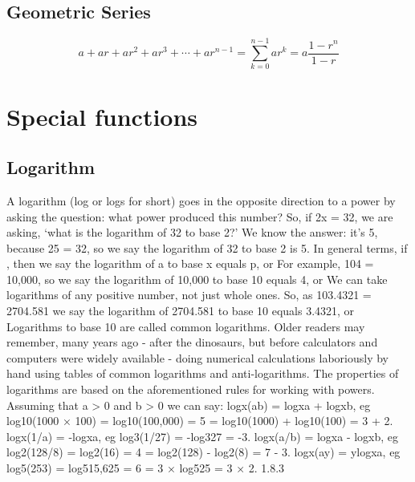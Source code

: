 \subsection{Geometric Series}
\begin{equation}
a + ar + ar^2 + ar^3 + \cdots + ar^{n-1} = \sum_{k=0}^{n-1}ar^k = a \frac{1-r^n}{1-r}
\end{equation}



\section{Special functions}
\subsection{Logarithm}
A logarithm (log or logs for short) goes in the opposite direction to a power by asking the question: what power produced this number? So, if 2x = 32, we are asking, ‘what is the logarithm of 32 to base 2?’ We know the answer: it's 5, because 25 = 32, so we say the logarithm of 32 to base 2 is 5. In general terms, if , then we say the logarithm of a to base x equals p, or For example, 104 = 10,000, so we say the logarithm of 10,000 to base 10 equals 4, or We can take logarithms of any positive number, not just whole ones. So, as 103.4321 = 2704.581 we say the logarithm of 2704.581 to base 10 equals 3.4321, or Logarithms to base 10 are called common logarithms. Older readers may remember, many years ago - after the dinosaurs, but before calculators and computers were widely available - doing numerical calculations laboriously by hand using tables of common logarithms and anti-logarithms. The properties of logarithms are based on the aforementioned rules for working with powers. Assuming that a > 0 and b > 0 we can say: logx(ab) = logxa + logxb, eg log10(1000 × 100) = log10(100,000) = 5 = log10(1000) + log10(100) = 3 + 2. logx(1/a) = -logxa, eg log3(1/27) = -log327 = -3. logx(a/b) = logxa - logxb, eg log2(128/8) = log2(16) = 4 = log2(128) - log2(8) = 7 - 3. logx(ay) = ylogxa, eg log5(253) = log515,625 = 6 = 3 × log525 = 3 × 2. 1.8.3


